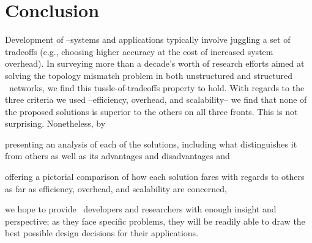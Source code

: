 \section{Conclusion}
\label{section:conclusion}

%
Development of \p--systems and applications
typically involve juggling a set of tradeoffs (e.g.,
choosing higher accuracy at the cost of increased system overhead).
In surveying more than
a decade's worth of research efforts aimed at solving the topology mismatch
problem in both unstructured and structured \p\ networks, we find this
tussle-of-tradeoffs property to hold.  
With regards to the three criteria we used --efficiency,
overhead, and scalability-- we find that none of the proposed solutions 
is superior to the others on all three fronts.  This is not surprising.
Nonetheless, by
\begin{inparaenum}
  \item presenting an analysis of each of the solutions,
including what distinguishes it from 
others as well as its advantages and disadvantages and 
  \item offering a pictorial
comparison of how each solution fares with regards to others 
as far as
efficiency, overhead, and scalability are concerned,
\end{inparaenum}
we hope to provide \p\
developers and researchers with enough insight and perspective;
as they face specific problems, they will be readily able to 
draw the best possible design decisions for their applications.
